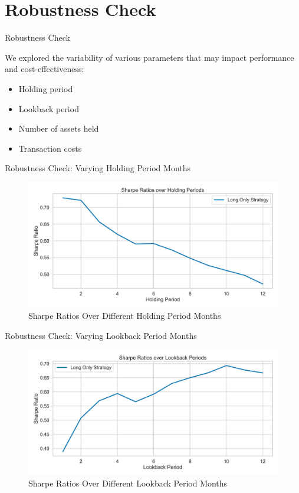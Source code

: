 \documentclass[10pt]{beamer}
\begin{document}
\section{Robustness Check}
\begin{frame}{Robustness Check}

We explored the variability of various parameters that may impact performance and cost-effectiveness:

\begin{itemize}
    \item Holding period
    \item Lookback period
    \item Number of assets held
    \item Transaction costs    
\end{itemize}
\end{frame}

\begin{frame}{Robustness Check: Varying Holding Period Months}
  \begin{figure}
   \caption{Sharpe Ratios Over Different Holding Period Months}
        \centering
        \includegraphics[width=\linewidth]{../figures/rc_holding_period.png}
    \end{figure}
\end{frame}

\begin{frame}{Robustness Check: Varying Lookback Period Months}
  \begin{figure}
   \caption{Sharpe Ratios Over Different Lookback Period Months}
        \centering
        \includegraphics[width=\linewidth]{../figures/rc_lookback_period.png}
    \end{figure}
\end{frame}
\end{document}

